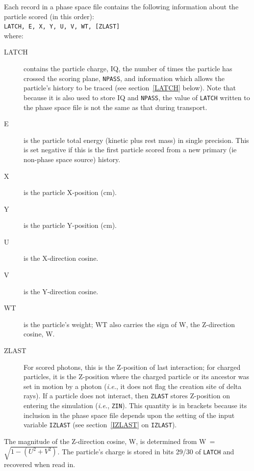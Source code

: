 \documentclass[12pt,twoside]{article}
\begin{document}
Each record in a phase space file contains the following information
about the particle scored (in this order):\\
\verb+LATCH, E, X, Y, U, V, WT, [ZLAST]+\\
where:
\vspace*{-4mm}
\begin{description}
\item [LATCH] contains the particle charge, IQ, the number of times
the particle has crossed the scoring plane, \verb+NPASS+, and information
which allows the particle's history to be traced (see section~\ref{LATCH}
below).  Note that because it is also used to store IQ and {\tt NPASS},
the value of \verb+LATCH+ written to the phase space file is not the
same as that during transport.
\item [E] is the particle total energy (kinetic plus rest mass) in single
precision.  This is set negative if this is the first particle scored
from a new primary (ie non-phase space source) history.
\item [X] is the particle X-position (cm).
\item [Y] is the particle Y-position (cm).
\item [U] is the X-direction cosine.
\item [V] is the Y-direction cosine.
\item [WT] is the particle's weight; WT also carries the
sign of W, the Z-direction cosine, W.
\item [ZLAST] For scored photons, this is the Z-position of last interaction;
for charged particles, it is the Z-position where the charged particle or its
ancestor was set in motion by a photon ({\em i.e.}, it does not flag the
creation site of delta rays).  If a particle does not interact, then {\tt ZLAST}
stores Z-position on entering the simulation ({\em i.e.}, {\tt ZIN}). This
quantity is in brackets because its inclusion in the phase space file
depends upon the setting of the input variable
\verb+IZLAST+ (see section~\ref{IZLAST} on \verb+IZLAST+).
 

\end{description}

The magnitude of the Z-direction cosine, W, is determined from
W~=~$\sqrt{1-(U^2+V^2)}$. The particle's charge is stored in bits 29/30
of \verb+LATCH+ and recovered when read in.
\end{document}
